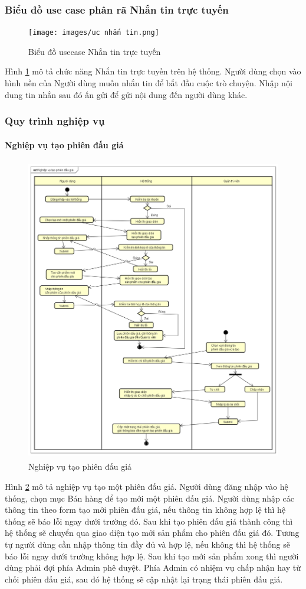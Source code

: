 \documentclass{article}
\begin{document}
\subsubsection{Biểu đồ use case phân rã Nhắn tin trực tuyến}
\begin{figure}[H]
    \centering
    \texttt{[image: images/uc nhắn tin.png]}
    \caption{Biểu đồ usecase Nhắn tin trực tuyến}
    \label{hinh26}
\end{figure}
Hình \ref{hinh26} mô tả chức năng Nhắn tin trực tuyến trên hệ thống. Người dùng chọn vào hình nền của Người dùng muốn nhắn tin để bắt đầu cuộc trò chuyện. Nhập nội dung tin nhắn sau đó ấn gửi để gửi nội dung đến người dùng khác. 
\subsubsection{Quy trình nghiệp vụ}
\paragraph{Nghiệp vụ tạo phiên đấu giá}\mbox{}
\begin{figure}[H]
    \centering
    \includegraphics[width=11.4cm,height=13.28cm]{images/nghiệp vụ tạo phiên đấu giá.png}
    \caption{Nghiệp vụ tạo phiên đấu giá}
    \label{hinh27}
\end{figure}
Hình \ref{hinh27} mô tả nghiệp vụ tạo một phiên đấu giá. Người dùng đăng nhập vào hệ thống, chọn mục Bán hàng để tạo mới một phiên đấu giá. Người dùng nhập các thông tin theo form tạo mới phiên đấu giá, nếu thông tin không hợp lệ thì hệ thống sẽ báo lỗi ngay dưới trường đó. Sau khi tạo phiên đấu giá thành công thì hệ thống sẽ chuyển qua giao diện tạo mới sản phẩm cho phiên đấu giá đó. Tương tự người dùng cần nhập thông tin đầy đủ và hợp lệ, nếu không thì hệ thống sẽ báo lỗi ngay dưới trường không hợp lệ. Sau khi tạo mới sản phẩm xong thì người dùng phải đợi phía Admin phê duyệt. Phía Admin có nhiệm vụ chấp nhận hay từ chối phiên đấu giá, sau đó hệ thống sẽ cập nhật lại trạng thái phiên đấu giá.
\end{document}
